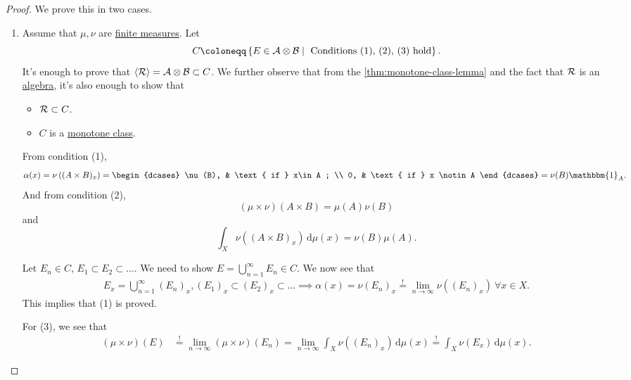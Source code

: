 \begin{proof}
	We prove this in two cases.
	\begin{enumerate}
		\item Assume that \(\mu , \nu \) are \hyperref[def:finite-measure]{finite measures}. Let
		      \[
			      C \coloneqq \left\{E\in \mathcal{\MakeUppercase{a}} \otimes \mathcal{\MakeUppercase{b}} \mid \text{ Conditions (1), (2), (3) hold} \right\}.
		      \]
		      It's enough to prove that \(\left< \mathcal{\MakeUppercase{r}}  \right> = \mathcal{\MakeUppercase{a}} \otimes \mathcal{\MakeUppercase{b}} \subset C\).
		      We further observe that from the \autoref{thm:monotone-class-lemma} and the fact that \(\mathcal{\MakeUppercase{r}} \) is an \hyperref[def:algebra]{algebra},
		      it's also enough to show that
		      \begin{itemize}
			      \item \(\mathcal{\MakeUppercase{r}} \subset C\).
			      \item \(C\) is a \hyperref[def:monotone-class]{monotone class}.
		      \end{itemize}
		      \par From condition (1),
		      \[
			      \alpha (x) = \nu \left((A\times B)_x\right) = \begin{dcases}
				      \nu (B), & \text{ if } x\in A ;   \\
				      0,       & \text{ if } x \notin A
			      \end{dcases} = \nu (B)\mathbbm{1}_{A}.
		      \]
		      And from condition (2),
		      \[
			      (\mu \times \nu )(A\times B) = \mu (A)\nu (B)
		      \]
		      and
		      \[
			      \int _X \nu ((A\times B)_x)\,\mathrm{d} \mu (x) = \nu (B)\mu (A).
		      \]

		      \par Let \(E_{n} \in C\), \(E_1\subset E_{2}\subset \ldots\). We need to show \(E = \bigcup\limits_{n=1}^{\infty} E_{n} \in C\).
		      We now see that
		      \[
			      \begin{split}
				      E_{x}  = \bigcup\limits_{n=1}^{\infty} (E_{n} )_x, (E_1)_x\subset (E_2)_x\subset \ldots
				      \implies \alpha (x) = \nu (E_n)_x \overset{\hyperref[thm:measure-space-continuity-from-below]{!}}{=} \lim\limits_{n \to \infty} \nu ((E_n)_x)\ \forall x\in X.
			      \end{split}
		      \]
		      This implies that (1) is proved.

		      For (3), we see that
		      \[
			      \begin{split}
				      (\mu \times \nu )(E)&\overset{\hyperref[thm:measure-space-continuity-from-below]{!}}{=}\lim\limits_{n \to \infty} (\mu \times \nu )(E_{n} )
				      = \lim\limits_{n \to \infty} \int _X \nu ((E_{n})_x) \,\mathrm{d} \mu (x)
				      \overset{\hyperref[thm:MCT]{!}}{=} \int _X \nu (E_{x} )\,\mathrm{d} \mu (x).
			      \end{split}
		      \]


\end{enumerate}
\end{proof}
